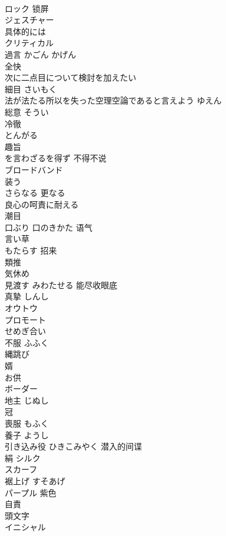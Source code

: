 \documentclass[8pt]{extreport}
\begin{document}
\begin{CJK}{UTF8}{min}
\\	ロック	锁屏
\\	ジェスチャー	
\\	具体的には	
\\	クリティカル	
\\	過言	かごん かげん
\\	全快	
\\	次に二点目について検討を加えたい	
\\	細目	さいもく
\\	法が法たる所以を失った空理空論であると言えよう	ゆえん
\\	総意	そうい
\\	冷徹	
\\	とんがる	
\\	趣旨	
\\	を言わざるを得ず	不得不说
\\	ブロードバンド	
\\	装う	
\\	さらなる	更なる
\\	良心の呵責に耐える	
\\	潮目	
\\	口ぶり 口のきかた	语气
\\	言い草	
\\	もたらす	招来
\\	類推	
\\	気休め	
\\	見渡す	みわたせる 能尽收眼底
\\	真摯	しんし
\\	オウトウ	
\\	プロモート	
\\	せめぎ合い	
\\	不服	ふふく
\\	縄跳び	
\\	婿	
\\	お供	
\\	ボーダー	
\\	地主	じぬし
\\	冠	
\\	喪服	もふく
\\	養子	ようし
\\	引き込み役	ひきこみやく 潜入的间谍
\\	絹	シルク
\\	スカーフ	
\\	裾上げ	すそあげ
\\	パープル	紫色
\\	自責	
\\	頭文字	
\\	イニシャル	

\end{CJK}
\end{document}
